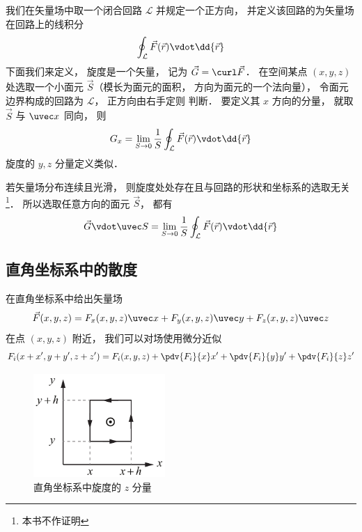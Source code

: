 
我们在矢量场中取一个闭合回路 $\mathcal L$ 并规定一个正方向， 并定义该回路的为矢量场在回路上的线积分
\begin{equation}
\oint_{\mathcal L} \vec F(\vec r) \vdot \dd{\vec r}
\end{equation}
下面我们来定义， 旋度是一个矢量， 记为 $\vec G = \curl \vec F$． 在空间某点 $(x,y,z)$ 处选取一个小面元 $\vec S$（模长为面元的面积， 方向为面元的一个法向量）， 令面元边界构成的回路为 $\mathcal L$， 正方向由右手定则 判断． 要定义其 $x$ 方向的分量， 就取 $\vec S$ 与 $\uvec x$ 同向， 则
\begin{equation}
G_x = \lim_{S\to 0} \frac 1S \oint_{\mathcal L} \vec F(\vec r) \vdot \dd{\vec r}
\end{equation}
旋度的 $y, z$ 分量定义类似．

若矢量场分布连续且光滑， 则旋度处处存在且与回路的形状和坐标系的选取无关\footnote{本书不作证明}． 所以选取任意方向的面元 $\vec S$， 都有
\begin{equation}
\vec G\vdot \uvec S = \lim_{S\to 0} \frac 1S \oint_{\mathcal L} \vec F(\vec r) \vdot \dd{\vec r}
\end{equation}

\subsection{直角坐标系中的散度}
在直角坐标系中给出矢量场
\begin{equation}
\vec F(x,y,z) = F_x(x,y,z)\uvec x + F_y(x,y,z)\uvec y + F_z(x,y,z)\uvec z
\end{equation}
在点 $(x,y,z)$ 附近， 我们可以对场使用微分近似
\begin{equation}
F_i(x+x', y+y', z+z') = F_i(x,y,z) + \pdv{F_i}{x}x' + \pdv{F_i}{y}y' + \pdv{F_i}{z}z'
\end{equation}

\begin{figure}[ht]
\centering
\includegraphics[width=5cm]{./figures/Curl1.pdf}
\caption{直角坐标系中旋度的 $z$ 分量} \label{Curl_fig1}
\end{figure}

